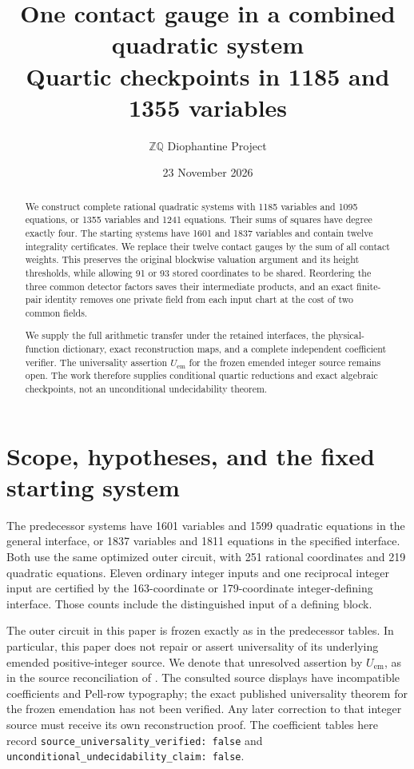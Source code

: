 \documentclass[11pt]{article}
\title{One contact gauge in a combined quadratic system\\
Quartic checkpoints in 1185 and 1355 variables}
\author{\(\mathbb Z\mathbb Q\) Diophantine Project}
\date{23 November 2026}
\begin{document}
\maketitle
\begin{abstract}
We construct complete rational quadratic systems with 1185 variables
and 1095 equations, or 1355 variables and 1241 equations. Their sums of
squares have degree exactly four. The starting systems have 1601 and
1837 variables and contain twelve integrality certificates. We replace
their twelve contact gauges by the sum of all contact weights. This
preserves the original blockwise valuation argument and its height
thresholds, while allowing 91 or 93 stored coordinates to be shared.
Reordering the three common detector factors saves their intermediate
products, and an exact finite-pair identity removes one private field
from each input chart at the cost of two common fields.

We supply the full arithmetic transfer under the retained interfaces,
the physical-function dictionary, exact reconstruction maps, and a
complete independent coefficient verifier. The universality assertion
\(U_{\mathrm{em}}\) for the frozen emended integer source remains open.
The work therefore supplies conditional quartic reductions and exact
algebraic checkpoints, not an unconditional undecidability theorem.
\end{abstract}

\section{Scope, hypotheses, and the fixed starting system}

The predecessor systems \cite{common} have 1601 variables and 1599
quadratic equations in the general interface, or 1837 variables and
1811 equations in the specified interface. Both use the same optimized
outer circuit, with 251 rational coordinates and 219 quadratic
equations. Eleven ordinary integer inputs and one reciprocal integer
input are certified by the 163-coordinate or 179-coordinate
integer-defining interface. Those counts include the distinguished
input of a defining block.

The outer circuit in this paper is frozen exactly as in the predecessor
tables. In particular, this paper does not repair or assert universality
of its underlying emended positive-integer source. We denote that
unresolved assertion by \(U_{\mathrm{em}}\), as in the source
reconciliation of \cite{outer}. The consulted source displays have
incompatible coefficients and Pell-row typography; the exact published
universality theorem for the frozen emendation has not been verified.
Any later correction to that integer source must receive its own
reconstruction proof. The coefficient tables here record
\texttt{source\_universality\_verified: false} and
\texttt{unconditional\_undecidability\_claim: false}.
\end{document}
